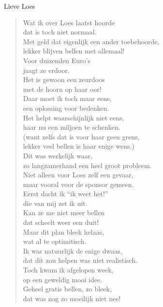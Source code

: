 \documentclass[12pt]{brief}
\date{4 december 2004}
\begin{document}
\begin{letter}{Lieve Loes}

\opening{}


\begin{verse}

Wat ik over Loes laatst hoorde\\
dat is toch niet normaal.\\
Met geld dat eigenlijk een ander toebehoorde,\\
lekker blijven bellen met allemaal!\\[0.5em]

Voor duizenden Euro's\\
jaagt ze erdoor.\\
Het is gewoon een zeurdoos\\
met de hoorn op haar oor!\\[0.5em]

Daar moet ik toch maar eens,\\
een oplossing voor bedenken.\\
Het helpt waarschijnlijk niet eens,\\
haar nu een miljoen te schenken.\\
(want zelfs dat is voor haar geen grens,\\
lekker veel bellen is haar enige wens.)\\[0.5em]

Dit was werkelijk waar,\\
zo langzamerhand een heel groot probleem.\\
Niet alleen voor Loes zelf een gevaar,\\
maar vooral voor de sponsor gemeen.\\[0.5em]

Eerst dacht ik ``ik weet het!''\\
die van mij zet ik uit.\\
Kan ze me niet meer bellen\\
dat scheelt weer een duit!\\[0.5em]

Maar dit plan bleek helaas,\\
wat al te optimitisch.\\
Ik was natuurlijk de enige dwaas,\\
dat dit zou helpen was niet realistisch.\\[0.5em]

Toch kwam ik afgelopen week,\\
op een geweldig mooi idee.\\
Geheel gratis bellen, zo bleek,\\
dat was nog zo moeilijk niet nee!\\[0.5em]


\end{verse}
\end{letter}
\end{document}
